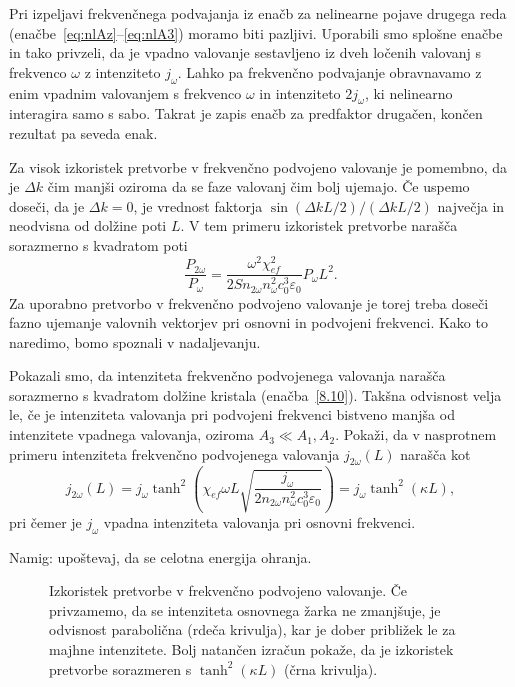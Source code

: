 \begin{remark}
Pri izpeljavi frekvenčnega podvajanja iz enačb za nelinearne pojave drugega
reda (enačbe~\ref{eq:nlAz}--\ref{eq:nlA3}) moramo biti pazljivi. 
Uporabili smo splošne enačbe in tako privzeli, da je 
vpadno valovanje sestavljeno iz dveh ločenih valovanj s frekvenco $\omega$
z intenziteto $j_\omega$. Lahko pa frekvenčno podvajanje obravnavamo
z enim vpadnim valovanjem s frekvenco $\omega$ in intenziteto $2j_\omega$, 
ki nelinearno interagira samo s sabo. Takrat je zapis enačb za predfaktor
drugačen, končen rezultat pa seveda enak. 
\end{remark}

Za visok izkoristek pretvorbe v frekvenčno podvojeno valovanje je  
pomembno, da je $\Delta k$ čim manjši oziroma da se faze valovanj čim bolj ujemajo.
Če uspemo doseči, da je $\Delta k = 0$, je vrednost faktorja 
$\sin(\Delta kL/2)/(\Delta kL/2)$ največja in neodvisna od dolžine poti $L$.
V tem primeru izkoristek pretvorbe narašča sorazmerno s kvadratom poti
\begin{equation}
\frac{P_{2\omega}}{P_{\omega}}=
\frac{\omega^2 \chi_{ef}^2}{2 S n_{2\omega} n_\omega^2c_0^3\varepsilon_0} P_\omega L^2.
\end{equation}
Za uporabno pretvorbo v frekvenčno podvojeno valovanje je torej treba doseči 
fazno ujemanje valovnih vektorjev 
pri osnovni in podvojeni frekvenci. Kako to naredimo,
bomo spoznali v nadaljevanju.

\begin{definition}
\label{deplet}
Pokazali smo, da intenziteta frekvenčno podvojenega valovanja narašča sorazmerno s
kvadratom dolžine kristala (enačba~\ref{8.10}). Takšna odvisnost velja le, če je intenziteta valovanja
pri podvojeni frekvenci bistveno manjša od intenzitete vpadnega valovanja, 
oziroma $A_3 \ll A_1, A_2$. Pokaži, da v nasprotnem primeru intenziteta frekvenčno
podvojenega valovanja $j_{2\omega}(L)$ narašča kot
\begin{equation}
j_{2\omega} (L) = j_\omega \tanh^2 \left(\chi_{ef}\omega L \sqrt{\frac{j_\omega}
{2 n_{2\omega} n_\omega^2 c_0^3 \varepsilon_0}} \right) = j_\omega \tanh^2(\kappa L),
\end{equation}
pri čemer je $j_\omega$ vpadna intenziteta valovanja pri osnovni frekvenci. 

Namig: upoštevaj, 
da se celotna energija ohranja.
\end{definition}

\begin{figure}[h]
\centering
\def\svgwidth{90truemm} 

\caption{Izkoristek pretvorbe v frekvenčno podvojeno valovanje. Če privzamemo, da se
intenziteta osnovnega žarka ne zmanjšuje, je odvisnost parabolična (rdeča krivulja), kar 
je dober približek le za majhne intenzitete. Bolj natančen izračun pokaže, da je izkoristek 
pretvorbe sorazmeren s $\tanh^2(\kappa L)$ (črna krivulja).}
\label{fig:shg2dep}
\end{figure}

